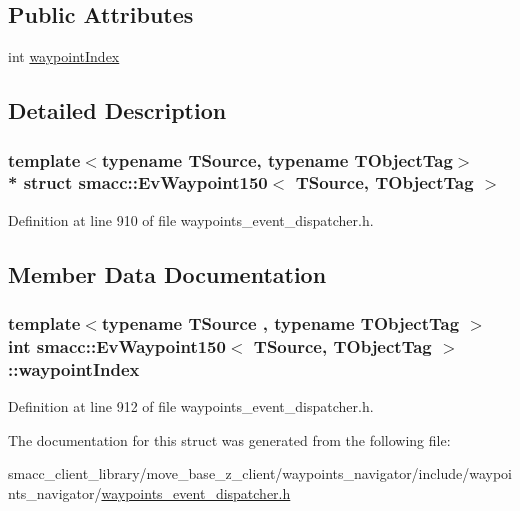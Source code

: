 \subsection*{Public Attributes}
\begin{DoxyCompactItemize}
\item 
int \hyperlink{structsmacc_1_1EvWaypoint150_a6d19e5f72810e9ba6ce1370ea71b1a3e}{waypoint\+Index}
\end{DoxyCompactItemize}


\subsection{Detailed Description}
\subsubsection*{template$<$typename T\+Source, typename T\+Object\+Tag$>$\\*
struct smacc\+::\+Ev\+Waypoint150$<$ T\+Source, T\+Object\+Tag $>$}



Definition at line 910 of file waypoints\+\_\+event\+\_\+dispatcher.\+h.



\subsection{Member Data Documentation}
\subsubsection[{\texorpdfstring{waypoint\+Index}{waypointIndex}}]{\setlength{\rightskip}{0pt plus 5cm}template$<$typename T\+Source , typename T\+Object\+Tag $>$ int {\bf smacc\+::\+Ev\+Waypoint150}$<$ T\+Source, T\+Object\+Tag $>$\+::waypoint\+Index}\hypertarget{structsmacc_1_1EvWaypoint150_a6d19e5f72810e9ba6ce1370ea71b1a3e}{}\label{structsmacc_1_1EvWaypoint150_a6d19e5f72810e9ba6ce1370ea71b1a3e}


Definition at line 912 of file waypoints\+\_\+event\+\_\+dispatcher.\+h.



The documentation for this struct was generated from the following file\+:\begin{DoxyCompactItemize}
\item 
smacc\+\_\+client\+\_\+library/move\+\_\+base\+\_\+z\+\_\+client/waypoints\+\_\+navigator/include/waypoints\+\_\+navigator/\hyperlink{waypoints__event__dispatcher_8h}{waypoints\+\_\+event\+\_\+dispatcher.\+h}\end{DoxyCompactItemize}
